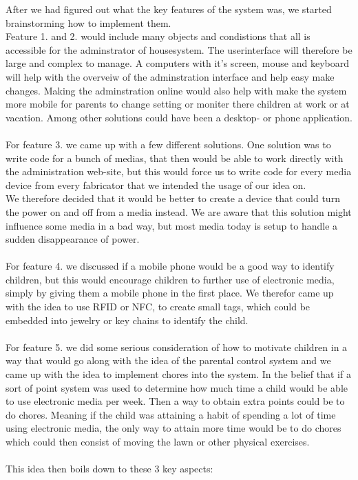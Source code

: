 After we had figured out what the key features of the system was, we started brainstorming how to implement them.\\
Feature 1. and 2. would include many objects and condistions that all is accessible for the adminstrator of housesystem. The userinterface will therefore be large and complex to manage. A computers with it's screen, mouse and keyboard will help with the overveiw of the adminstration interface and help easy make changes. Making the adminstration online would also help with make the system more mobile for parents to change setting or moniter there children at work or at vacation. Among other solutions could have been a desktop- or phone application.\\
\\
For feature 3. we came up with a few different solutions. One solution was to write code for a bunch of medias, that then would be able to work directly with the administration web-site, but this would force us to write code for every media device from every fabricator that we intended the usage of our idea on.\\
We therefore decided that it would be better to create a device that could turn the power on and off from a media instead. We are aware that this solution might influence some media in a bad way, but most media today is setup to handle a sudden disappearance of power.\\
\\
For feature 4. we discussed if a mobile phone would be a good way to identify children, but this would encourage children to further use of electronic media, simply by giving them a mobile phone in the first place. We therefor came up with the idea to use RFID or NFC, to create small tags, which could be embedded into jewelry or key chains to identify the child.\\
\\
For feature 5. we did some serious consideration of how to motivate children in a way that would go along with the idea of the parental control system and we came up with the idea to implement chores into the system. In the belief that if a sort of point system was used to determine how much time a child would be able to use electronic media per week. Then a way to obtain extra points could be to do chores. Meaning if the child was attaining a habit of spending a lot of time using electronic media, the only way to attain more time would be to do chores which could then consist of moving the lawn or other physical exercises.\\
\\
This idea then boils down to these 3 key aspects:

